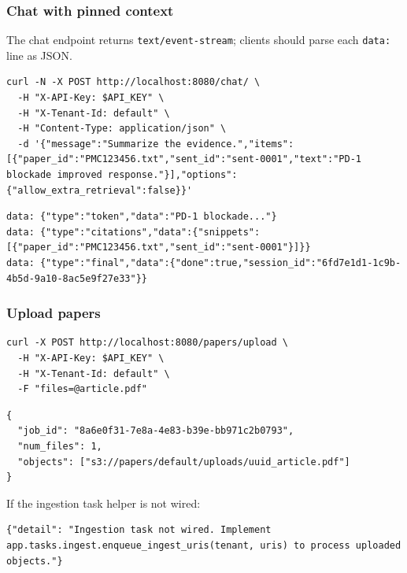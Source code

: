 \documentclass[10pt,letterpaper]{article}
\begin{document}
\subsubsection{Chat with pinned context}

The chat endpoint returns \texttt{text/event-stream}; clients should parse each \texttt{data:} line as JSON.

\begin{Verbatim}[fontsize=\scriptsize,breaklines=true,breakanywhere=true]
curl -N -X POST http://localhost:8080/chat/ \
  -H "X-API-Key: $API_KEY" \
  -H "X-Tenant-Id: default" \
  -H "Content-Type: application/json" \
  -d '{"message":"Summarize the evidence.","items":[{"paper_id":"PMC123456.txt","sent_id":"sent-0001","text":"PD-1 blockade improved response."}],"options":{"allow_extra_retrieval":false}}'
\end{Verbatim}

\begin{Verbatim}[fontsize=\scriptsize,breaklines=true,breakanywhere=true]
data: {"type":"token","data":"PD-1 blockade..."}
data: {"type":"citations","data":{"snippets":[{"paper_id":"PMC123456.txt","sent_id":"sent-0001"}]}}
data: {"type":"final","data":{"done":true,"session_id":"6fd7e1d1-1c9b-4b5d-9a10-8ac5e9f27e33"}}
\end{Verbatim}

\subsubsection{Upload papers}

\begin{Verbatim}[fontsize=\scriptsize,breaklines=true,breakanywhere=true]
curl -X POST http://localhost:8080/papers/upload \
  -H "X-API-Key: $API_KEY" \
  -H "X-Tenant-Id: default" \
  -F "files=@article.pdf"
\end{Verbatim}

\begin{Verbatim}[fontsize=\scriptsize,breaklines=true,breakanywhere=true]
{
  "job_id": "8a6e0f31-7e8a-4e83-b39e-bb971c2b0793",
  "num_files": 1,
  "objects": ["s3://papers/default/uploads/uuid_article.pdf"]
}
\end{Verbatim}

If the ingestion task helper is not wired:

\begin{Verbatim}[fontsize=\scriptsize,breaklines=true,breakanywhere=true]
{"detail": "Ingestion task not wired. Implement app.tasks.ingest.enqueue_ingest_uris(tenant, uris) to process uploaded objects."}
\end{Verbatim}
\end{document}

